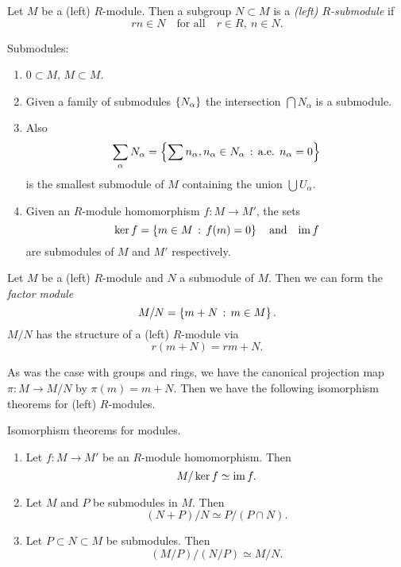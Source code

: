 \begin{dfn}
  Let $M$ be a (left) $R$-module. Then a subgroup $N \subset M$ is a \emph{(left) $R$-submodule} if
  \[
  rn \in N \quad \text{for all} \quad r \in R,\ n \in N.
  \]
\end{dfn}

\begin{eg}
  Submodules:
  \begin{enumerate}
  \item $0 \subset M$, $M \subset M$.
  \item Given a family of submodules $\left\{N_\alpha\right\}$ the intersection $\bigcap N_\alpha$ is a submodule.
  \item Also
    \[
    \sum_{\alpha} N_\alpha = \left\{\sum n_\alpha, n_\alpha \in N_\alpha \,:\, \text{a.e. } n_\alpha = 0\right\}
    \]
    is the smallest submodule of $M$ containing the union $\bigcup U_\alpha$.
  \item Given an $R$-module homomorphism $f : M \to M'$, the sets
    \[
    \ker f = \left\{m \in M \,:\, f(m) = 0\right\} \quad \text{and} \quad \mathrm{im}\, f
    \]
    are submodules of $M$ and $M'$ respectively.
  \end{enumerate}
\end{eg}

\begin{dfn}
  Let $M$ be a (left) $R$-module and $N$ a submodule of $M$. Then we can form the \emph{factor module}
  \[
  M / N = \left\{m + N \,:\, m \in M\right\}.
  \]
  $M/N$ has the structure of a (left) $R$-module via
  \[
  r(m + N) = rm + N.
  \]
\end{dfn}

As was the case with groups and rings, we have the canonical projection map $\pi : M \to M/N$ by $\pi(m) = m + N$. Then we have the following isomorphism theorems for (left) $R$-modules.

\begin{thm}
  Isomorphism theorems for modules. 
  \begin{enumerate}
  \item Let $f : M \to M'$ be an $R$-module homomorphism. Then
    \[
    M / \ker f \simeq \mathrm{im}\, f.
    \]
  \item Let $M$ and $P$ be submodules in $M$. Then
    \[
    (N + P)/N \simeq P/(P \cap N).
    \]
  \item Let $P \subset N \subset M$ be submodules. Then
    \[
    (M/P)/(N/P) \simeq M / N.
    \]
  \end{enumerate}
\end{thm}

